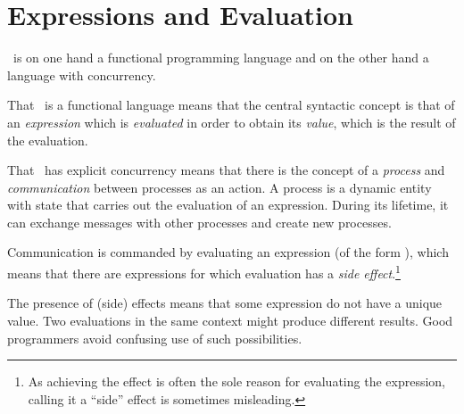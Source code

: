 %
%
%
%
%
%
%

\chapter{Expressions and Evaluation}

\label{chapter:expressions-evaluation}

\Erlang\ is on one hand a functional programming
language and on the other hand a
language with concurrency.

That \Erlang\ is a functional language means that the central syntactic
concept is that of an \emph{expression} which is \emph{evaluated} in
order to obtain its \emph{value}, which is the result of the evaluation.

That \Erlang\ has explicit concurrency means that there is the concept
of a \emph{process} and
\emph{communication} between processes as an
action.  A process is a dynamic entity with state that carries out the
evaluation of an expression.  During its lifetime, it can exchange
messages with other processes and create new processes.

Communication is commanded by evaluating an expression (of the form
), which means that there are expressions for which
evaluation has a \emph{side effect}.\footnote{As achieving the effect is
often the sole reason for evaluating the expression, calling it a
``side'' effect is sometimes misleading.}

The presence of (side) effects means that some expression do not have
a unique value.  Two evaluations in the same context might produce
different results.  Good programmers avoid confusing use of such
possibilities.


